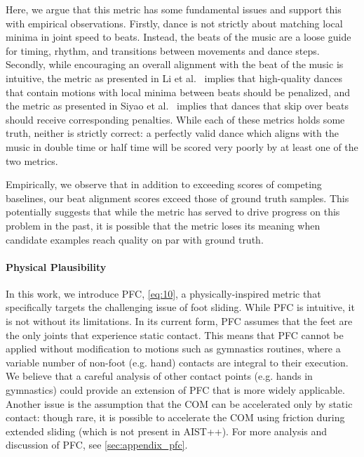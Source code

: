 \documentclass[10pt,twocolumn,letterpaper]{article}
\begin{document}
Here, we argue that this metric has some fundamental issues and support this with empirical observations.
Firstly, dance is not strictly about matching local minima in joint speed to beats.
Instead, the beats of the music are a loose guide for timing, rhythm, and transitions between movements and dance steps.
Secondly, while encouraging an overall alignment with the beat of the music is intuitive, the metric as presented in Li et al.~\cite{li2021ai} implies that high-quality dances that contain motions with local minima between beats should be penalized, and the metric as presented in Siyao et al.~\cite{siyao2022bailando} implies that dances that skip over beats should receive corresponding penalties. While each of these metrics holds some truth, neither is strictly correct: a perfectly valid dance which aligns with the music in double time or half time will be scored very poorly by at least one of the two metrics.

Empirically, we observe that in addition to exceeding scores of competing baselines, our beat alignment scores exceed those of ground truth samples.
This potentially suggests that while the metric has served to drive progress on this problem in the past, it is possible that the metric loses its meaning when candidate examples reach quality on par with ground truth.

\paragraph{Physical Plausibility} \label{par:physical_plausibility}

In this work, we introduce PFC, \cref{eq:10}, a physically-inspired metric that specifically targets the challenging issue of foot sliding.
While PFC is intuitive, it is not without its limitations.
In its current form, PFC assumes that the feet are the only joints that experience static contact.
This means that PFC cannot be applied without modification to motions such as gymnastics routines, where a variable number of non-foot (e.g. hand) contacts are integral to their execution.
We believe that a careful analysis of other contact points (e.g. hands in gymnastics) could provide an extension of PFC that is more widely applicable.
Another issue is the assumption that the COM can be accelerated only by static contact: though rare, it is possible to accelerate the COM using friction during extended sliding (which is not present in AIST++).
For more analysis and discussion of PFC, see \cref{sec:appendix_pfc}.
\end{document}
